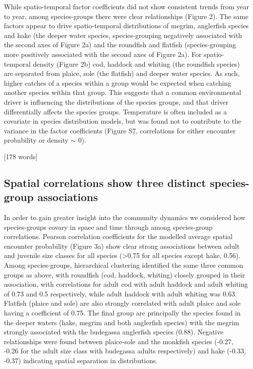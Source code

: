 \documentclass{nature}
\begin{document}
\begin{linenumbers}
While spatio-temporal factor coefficients did not show consistent trends from
year to year, among species-groups there were clear relationships (Figure 2).
The same factors appear to drive spatio-temporal distributions of megrim,
anglerfish species and hake (the deeper water species, species-grouping
negatively associated with the second axes of Figure 2a) and the roundfish and
flatfish (species-grouping more positively associated with the second axes of
Figure 2a). For spatio-temporal density (Figure 2b) cod, haddock and whiting
(the roundfish species) are separated from plaice, sole (the flatfish) and
deeper water species. As such, higher catches of a species within a group would
be expected when catching another species within that group. This suggests that
a common environmental driver is influencing the distributions of the species
groups, and that driver differentially affects the species groups. Temperature
is often included as a covariate in species distribution models, but was found
not to contribute to the variance in the factor coefficients (Figure S7,
correlations for either encounter probability or density $\sim$ 0).

[178 words]

\subsection{Spatial correlations show three distinct species-group
	associations} In order to gain greater insight into the community
dynamics we considered how species-groups covary in space and time through
among species-group correlations. Pearson correlation coefficients for the
modelled average spatial encounter probability (Figure 3a) show clear strong
associations between adult and juvenile size classes for all species
(\textgreater 0.75 for all species except hake, 0.56).  Among species-groups,
hierarchical clustering identified the same three common groups as above, with
roundfish (cod, haddock, whiting) closely grouped in their association, with
correlations for adult cod with adult haddock and adult whiting of 0.73 and 0.5
respectively, while adult haddock with adult whiting was 0.63. Flatfish (plaice
and sole) are also strongly correlated with adult plaice and sole having a
coefficient of 0.75.  The final group are principally the species found in the
deeper waters (hake, megrim and both anglerfish species) with the megrim
strongly associated with the budegassa anglerfish species (0.88). Negative
relationships were found between plaice-sole and the monkfish species (-0.27,
-0.26 for the adult size class with budegassa adults respectively) and hake
(-0.33, -0.37) indicating spatial separation in distributions.


\end{linenumbers}
\end{document}

